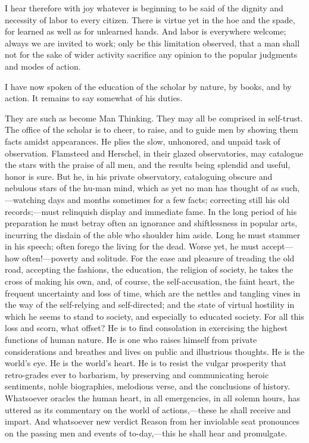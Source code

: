 I hear therefore with joy whatever is beginning to be said of the
dignity and necessity of labor to every citizen. There is virtue yet
in the hoe and the spade, for learned as well as for unlearned hands.
And labor is everywhere welcome; always we are invited to work; only
be this limitation observed, that a man shall not for the sake of
wider activity sacrifice any opinion to the popular judgments and
modes of action.

\vspace{1\baselineskip}

I have now spoken of the education of the scholar by nature, by books,
and by action. It remains to say somewhat of his duties.

They are such as become Man Thinking. They may all be comprised in
self-trust. The office of the scholar is to cheer, to raise, and to
guide men by showing them facts amidst appearances. He plies the slow,
unhonored, and unpaid task of observation. Flamsteed and Herschel, in
their glazed observatories, may catalogue the stars with the praise of
all men, and the results being splendid and useful, honor is sure. But
he, in his private observatory, cataloguing obscure and nebulous stars
of the hu-man mind, which as yet no man has thought of as
such,---watch\-ing days and months sometimes for a few facts;
correcting still his old re\-cords;---must relinquish display and
immediate fame. In the long period of his preparation he must betray
often an ignorance and shiftlessness in popular arts, incurring the
disdain of the able who shoulder him aside. Long he must stammer in
his speech; often forego the living for the dead. Worse yet, he must
ac\-cept---how often!---po\-ver\-ty and solitude. For the ease and
pleasure of treading the old road, accepting the fashions, the
education, the religion of society, he takes the cross of making his
own, and, of course, the self-accusation, the faint heart, the
frequent uncertainty and loss of time, which are the nettles and
tangling vines in the way of the self-relying and self-directed; and
the state of virtual hostility in which he seems to stand to society,
and especially to educated society. For all this loss and scorn, what
offset? He is to find consolation in exercising the highest functions
of human nature. He is one who raises himself from private
considerations and breathes and lives on public and illustrious
thoughts. He is the world's eye. He is the world's heart. He is to
resist the vulgar prosperity that retro-grades ever to
barbarism, by preserving and communicating heroic sentiments, noble
biographies, melodious verse, and the conclusions of history.
Whatsoever oracles the human heart, in all emergencies, in all solemn
hours, has uttered as its commentary on the world of
ac\-tions,---these he shall receive and impart. And whatsoever new
verdict Reason from her inviolable seat pronounces on the passing men
and events of to-day,---this he shall hear and promulgate.

